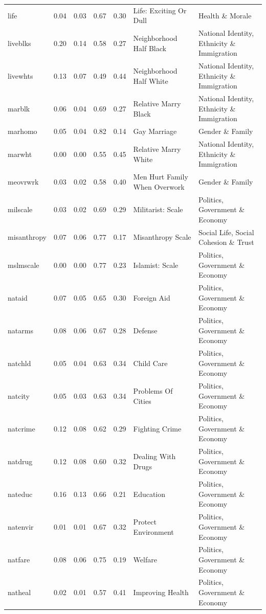 \documentclass[
  12pt,
]{article}
\begin{document}
\begin{landscape}
\begin{scriptsize}
\begin{longtable}{|p{1.75in}|p{0.3in}|p{0.3in}|p{0.3in}|p{0.3in}|p{2.5in}|p{2.5in}}
life & 0.04 & 0.03 & 0.67 & 0.30 & Life: Exciting Or Dull & Health \& Morale \\ 
liveblks & 0.20 & 0.14 & 0.58 & 0.27 & Neighborhood Half Black & National Identity, Ethnicity \& Immigration \\ 
livewhts & 0.13 & 0.07 & 0.49 & 0.44 & Neighborhood Half White & National Identity, Ethnicity \& Immigration \\ 
marblk & 0.06 & 0.04 & 0.69 & 0.27 & Relative Marry Black & National Identity, Ethnicity \& Immigration \\ 
marhomo & 0.05 & 0.04 & 0.82 & 0.14 & Gay Marriage & Gender \& Family \\ 
marwht & 0.00 & 0.00 & 0.55 & 0.45 & Relative Marry White & National Identity, Ethnicity \& Immigration \\ 
meovrwrk & 0.03 & 0.02 & 0.58 & 0.40 & Men Hurt Family When Overwork & Gender \& Family \\ 
milscale & 0.03 & 0.02 & 0.69 & 0.29 & Militarist: Scale & Politics, Government \& Economy \\ 
misanthropy & 0.07 & 0.06 & 0.77 & 0.17 & Misanthropy Scale & Social Life, Social Cohesion \& Trust \\ 
mslmscale & 0.00 & 0.00 & 0.77 & 0.23 & Islamist: Scale & Politics, Government \& Economy \\ 
nataid & 0.07 & 0.05 & 0.65 & 0.30 & Foreign Aid & Politics, Government \& Economy \\ 
natarms & 0.08 & 0.06 & 0.67 & 0.28 & Defense & Politics, Government \& Economy \\ 
natchld & 0.05 & 0.04 & 0.63 & 0.34 & Child Care & Politics, Government \& Economy \\ 
natcity & 0.05 & 0.03 & 0.63 & 0.34 & Problems Of Cities & Politics, Government \& Economy \\ 
natcrime & 0.12 & 0.08 & 0.62 & 0.29 & Fighting Crime & Politics, Government \& Economy \\ 
natdrug & 0.12 & 0.08 & 0.60 & 0.32 & Dealing With Drugs & Politics, Government \& Economy \\ 
nateduc & 0.16 & 0.13 & 0.66 & 0.21 & Education & Politics, Government \& Economy \\ 
natenvir & 0.01 & 0.01 & 0.67 & 0.32 & Protect Environment & Politics, Government \& Economy \\ 
natfare & 0.08 & 0.06 & 0.75 & 0.19 & Welfare & Politics, Government \& Economy \\ 
natheal & 0.02 & 0.01 & 0.57 & 0.41 & Improving Health & Politics, Government \& Economy \\ 

\end{longtable}
\end{scriptsize}
\end{landscape}
\end{document}
